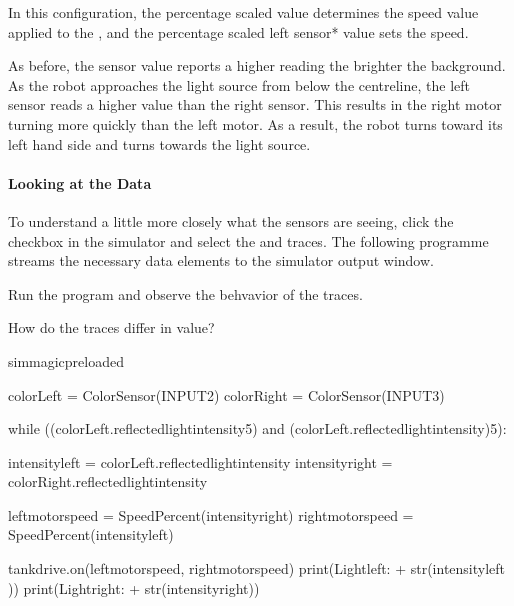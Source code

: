 \documentclass[letterpaper,10pt,english]{sphinxmanual}
\begin{document}
In this configuration, the percentage scaled  value determines the speed value applied to the , and the percentage scaled left sensor* value sets the  speed.

As before, the sensor value reports a higher reading the brighter the background. As the robot approaches the light source from below the centreline, the left sensor reads a higher value than the right sensor. This results in the right motor turning more quickly than the left motor. As a result, the robot turns toward its left hand side and turns towards the light source.


\paragraph{Looking at the Data}
\label{\detokenize{content/03_Robot_Lab/Section_00_03:Looking-at-the-Data}}
To understand a little more closely what the sensors are seeing, click the  checkbox in the simulator and select the  and  traces. The following programme streams the necessary data elements to the simulator output window.

Run the program and observe the behvavior of the traces.

How do the traces differ in value?

{
\begin{sphinxVerbatim}[commandchars=\\\{\}]
\llap{\color{nbsphinxin}[ ]:\,\hspace{\fboxrule}\hspace{\fboxsep}}\PYGZpc{}\PYGZpc{}sim\PYGZus{}magic\PYGZus{}preloaded

colorLeft = ColorSensor(INPUT\PYGZus{}2)
colorRight = ColorSensor(INPUT\PYGZus{}3)

while ((colorLeft.reflected\PYGZus{}light\PYGZus{}intensity\PYGZgt{}5)
       and (colorLeft.reflected\PYGZus{}light\PYGZus{}intensity)\PYGZgt{}5):

    intensity\PYGZus{}left = colorLeft.reflected\PYGZus{}light\PYGZus{}intensity
    intensity\PYGZus{}right = colorRight.reflected\PYGZus{}light\PYGZus{}intensity

    left\PYGZus{}motor\PYGZus{}speed = SpeedPercent(intensity\PYGZus{}right)
    right\PYGZus{}motor\PYGZus{}speed = SpeedPercent(intensity\PYGZus{}left)

    tank\PYGZus{}drive.on(left\PYGZus{}motor\PYGZus{}speed, right\PYGZus{}motor\PYGZus{}speed)
    print(\PYGZsq{}Light\PYGZus{}left: \PYGZsq{} + str(intensity\PYGZus{}left ))
    print(\PYGZsq{}Light\PYGZus{}right: \PYGZsq{} + str(intensity\PYGZus{}right))
\end{sphinxVerbatim}
}
\end{document}
